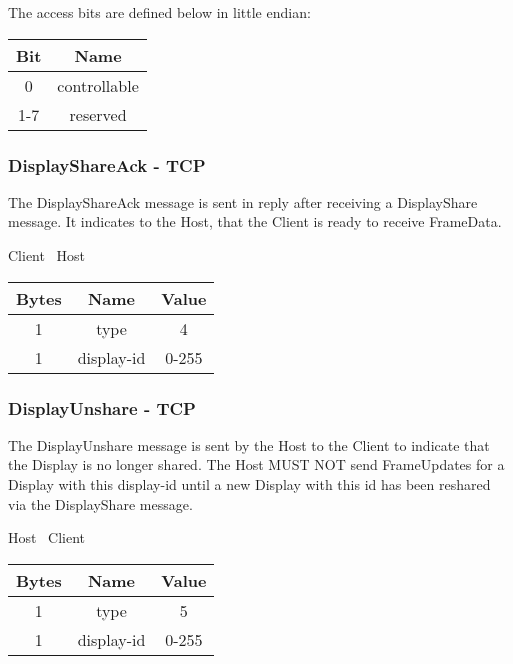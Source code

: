 The access bits are defined below in little endian:

\begin{center}
    \begin{tabular}{|c|c|}
        \hline
        \textbf{Bit} & \textbf{Name} \\
        \hline
        0            & controllable  \\
        \hline
        1-7          & reserved      \\
        \hline
    \end{tabular}
\end{center}

\subsubsection{DisplayShareAck - TCP}

The DisplayShareAck message is sent in reply after receiving a DisplayShare message.
It indicates to the Host, that the Client is ready to receive FrameData.

\begin{center}
    Client \textrightarrow\ Host\\
    \begin{tabular}{|c|c|c|}
        \hline
        \textbf{Bytes} & \textbf{Name} & \textbf{Value} \\
        \hline
        1              & type          & 4              \\
        \hline
        1              & display-id    & 0-255          \\
        \hline
    \end{tabular}
\end{center}

\subsubsection{DisplayUnshare - TCP}

The DisplayUnshare message is sent by the Host to the Client to indicate that the Display is no longer shared.
The Host MUST NOT send FrameUpdates for a Display with this display-id until a new Display with this id has been
reshared via the DisplayShare message.

\begin{center}
    Host \textrightarrow\ Client\\
    \begin{tabular}{|c|c|c|}
        \hline
        \textbf{Bytes} & \textbf{Name} & \textbf{Value} \\
        \hline
        1              & type          & 5              \\
        \hline
        1              & display-id    & 0-255          \\
        \hline
    \end{tabular}
\end{center}

